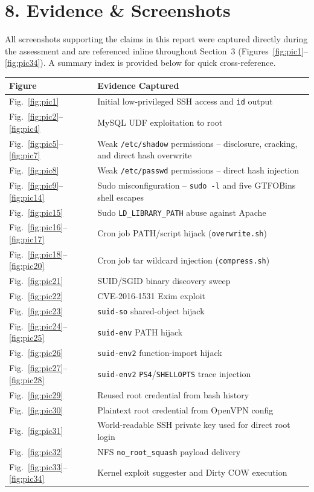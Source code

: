 \documentclass[11pt]{article}
\begin{document}
\section{8. Evidence \& Screenshots}

All screenshots supporting the claims in this report were captured directly during the assessment
and are referenced inline throughout Section~3 (Figures~\ref{fig:pic1}--\ref{fig:pic34}). A summary
index is provided below for quick cross-reference.

\begin{center}
\begin{tabular}{L{1.6cm}L{11.5cm}}
\toprule
\textbf{Figure} & \textbf{Evidence Captured} \\
\midrule
Fig.~\ref{fig:pic1} & Initial low-privileged SSH access and \texttt{id} output \\
Fig.~\ref{fig:pic2}--\ref{fig:pic4} & MySQL UDF exploitation to root \\
Fig.~\ref{fig:pic5}--\ref{fig:pic7} & Weak \texttt{/etc/shadow} permissions -- disclosure, cracking, and direct hash overwrite \\
Fig.~\ref{fig:pic8} & Weak \texttt{/etc/passwd} permissions -- direct hash injection \\
Fig.~\ref{fig:pic9}--\ref{fig:pic14} & Sudo misconfiguration -- \texttt{sudo -l} and five GTFOBins shell escapes \\
Fig.~\ref{fig:pic15} & Sudo \texttt{LD\_LIBRARY\_PATH} abuse against Apache \\
Fig.~\ref{fig:pic16}--\ref{fig:pic17} & Cron job PATH/script hijack (\texttt{overwrite.sh}) \\
Fig.~\ref{fig:pic18}--\ref{fig:pic20} & Cron job tar wildcard injection (\texttt{compress.sh}) \\
Fig.~\ref{fig:pic21} & SUID/SGID binary discovery sweep \\
Fig.~\ref{fig:pic22} & CVE-2016-1531 Exim exploit \\
Fig.~\ref{fig:pic23} & \texttt{suid-so} shared-object hijack \\
Fig.~\ref{fig:pic24}--\ref{fig:pic25} & \texttt{suid-env} PATH hijack \\
Fig.~\ref{fig:pic26} & \texttt{suid-env2} function-import hijack \\
Fig.~\ref{fig:pic27}--\ref{fig:pic28} & \texttt{suid-env2} \texttt{PS4}/\texttt{SHELLOPTS} trace injection \\
Fig.~\ref{fig:pic29} & Reused root credential from bash history \\
Fig.~\ref{fig:pic30} & Plaintext root credential from OpenVPN config \\
Fig.~\ref{fig:pic31} & World-readable SSH private key used for direct root login \\
Fig.~\ref{fig:pic32} & NFS \texttt{no\_root\_squash} payload delivery \\
Fig.~\ref{fig:pic33}--\ref{fig:pic34} & Kernel exploit suggester and Dirty COW execution \\
\bottomrule
\end{tabular}
\end{center}
\end{document}

